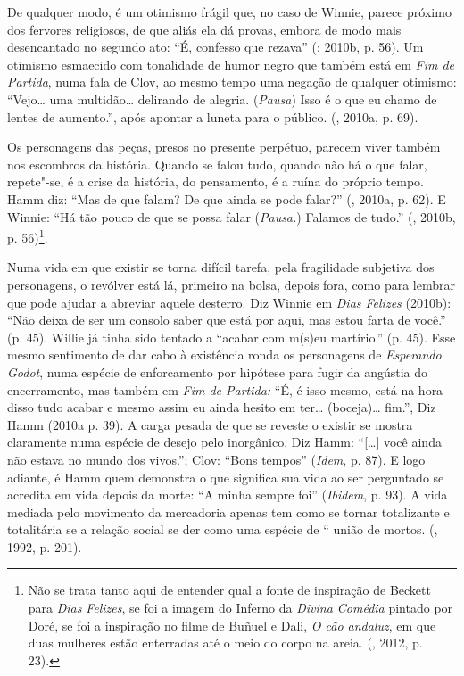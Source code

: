 {De qualquer modo, é um otimismo frágil que, no caso de Winnie, parece
próximo dos fervores religiosos, de que aliás ela dá provas, embora de
modo mais desencantado no segundo ato: ``É, confesso que rezava''
(; 2010b, p. 56). Um otimismo esmaecido com tonalidade de humor
negro que também está em \emph{Fim de Partida}, numa fala de Clov, ao
mesmo tempo uma negação de qualquer otimismo: ``Vejo\ldots{} uma multidão\ldots{}
delirando de alegria. (\emph{Pausa}) Isso é o que eu chamo de lentes de
aumento.'', após apontar a luneta para o público. (, 2010a, p.
69).

Os personagens das peças, presos no presente perpétuo, parecem viver
também nos escombros da história. Quando se falou tudo, quando não há o
que falar, repete"-se, é a crise da história, do pensamento, é a ruína do
próprio tempo. Hamm diz: ``Mas de que falam? De que ainda se pode
falar?'' (, 2010a, p. 62). E Winnie: ``Há tão pouco de que se
possa falar (\emph{Pausa.}) Falamos de tudo.'' (, 2010b, p.
56)\footnote{Não se trata tanto aqui de entender qual a fonte de
  inspiração de Beckett para \emph{Dias} \emph{Felizes}, se foi a imagem
  do Inferno da \emph{Divina Comédia} pintado por Doré, se foi a
  inspiração no filme de Buñuel e Dali, \emph{O cão andaluz}, em que
  duas mulheres estão enterradas até o meio do corpo na areia.
  (, 2012, p. 23).}.

Numa vida em que existir se torna difícil tarefa, pela fragilidade
subjetiva dos personagens, o revólver está lá, primeiro na bolsa, depois
fora, como para lembrar que pode ajudar a abreviar aquele desterro. Diz
Winnie em \emph{Dias Felizes} (2010b): ``Não deixa de ser um consolo
saber que está por aqui, mas estou farta de você.'' (p. 45). Willie já
tinha sido tentado a ``acabar com m(s)eu martírio.'' (p. 45). Esse mesmo
sentimento de dar cabo à existência ronda os personagens de
\emph{Esperando Godot}, numa espécie de enforcamento por hipótese para
fugir da angústia do encerramento, mas também em \emph{Fim de Partida:}
``É, é isso mesmo, está na hora disso tudo acabar e mesmo assim eu ainda
hesito em ter\ldots{} (boceja)\ldots{} fim.'', Diz Hamm (2010a p. 39). A carga
pesada de que se reveste o existir se mostra claramente numa espécie de
desejo pelo inorgânico. Diz Hamm: ``[\ldots{}] você ainda não estava no
mundo dos vivos.''; Clov: ``Bons tempos'' (\emph{Idem}, p. 87). E logo
adiante, é Hamm quem demonstra o que significa sua vida ao ser
perguntado se acredita em vida depois da morte: ``A minha sempre foi''
(\emph{Ibidem}, p. 93). A vida mediada pelo movimento da mercadoria
apenas tem como se tornar totalizante e totalitária se a relação social
se der como uma espécie de `` união de mortos. (, 1992, p. 201).

}
